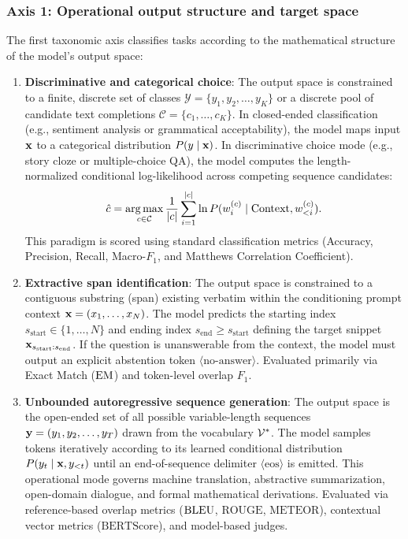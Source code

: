 \documentclass[../../main.tex]{subfiles}
\begin{document}
\subsubsection{Axis 1: Operational output structure and target space}
The first taxonomic axis classifies tasks according to the mathematical structure of the model's output space:
\begin{enumerate}
    \item \textbf{Discriminative and categorical choice}: The output space is constrained to a finite, discrete set of classes $\mathcal{Y} = \{y_1, y_2, \dots, y_K\}$ or a discrete pool of candidate text completions $\mathcal{C} = \{c_1, \dots, c_K\}$. In closed-ended classification (e.g., sentiment analysis or grammatical acceptability), the model maps input $\mathbf{x}$ to a categorical distribution $P(y \mid \mathbf{x})$. In discriminative choice mode (e.g., story cloze or multiple-choice QA), the model computes the length-normalized conditional log-likelihood across competing sequence candidates:
    \begin{equation}
    \label{eq:discriminative_choice}
    \hat{c} = \operatorname*{\mathrm{arg\,max}}_{c \in \mathcal{C}} \frac{1}{|c|} \sum_{i=1}^{|c|} \ln P(w_i^{(c)} \mid \text{Context}, w_{<i}^{(c)}).
    \end{equation}
    This paradigm is scored using standard classification metrics (Accuracy, Precision, Recall, Macro-$F_1$, and Matthews Correlation Coefficient).
    \item \textbf{Extractive span identification}: The output space is constrained to a contiguous substring (span) existing verbatim within the conditioning prompt context $\mathbf{x} = (x_1, \dots, x_N)$. The model predicts the starting index $s_{\text{start}} \in \{1, \dots, N\}$ and ending index $s_{\text{end}} \ge s_{\text{start}}$ defining the target snippet $\mathbf{x}_{s_{\text{start}}:s_{\text{end}}}$. If the question is unanswerable from the context, the model must output an explicit abstention token $\langle\text{no-answer}\rangle$. Evaluated primarily via Exact Match ($\mathrm{EM}$) and token-level overlap $F_1$.
    \item \textbf{Unbounded autoregressive sequence generation}: The output space is the open-ended set of all possible variable-length sequences $\mathbf{y} = (y_1, y_2, \dots, y_T)$ drawn from the vocabulary $\mathcal{V}^*$. The model samples tokens iteratively according to its learned conditional distribution $P(y_t \mid \mathbf{x}, y_{<t})$ until an end-of-sequence delimiter $\langle\text{eos}\rangle$ is emitted. This operational mode governs machine translation, abstractive summarization, open-domain dialogue, and formal mathematical derivations. Evaluated via reference-based overlap metrics ($\mathrm{BLEU}$, $\text{ROUGE}$, $\text{METEOR}$), contextual vector metrics ($\text{BERTScore}$), and model-based judges.
\end{enumerate}
\end{document}
